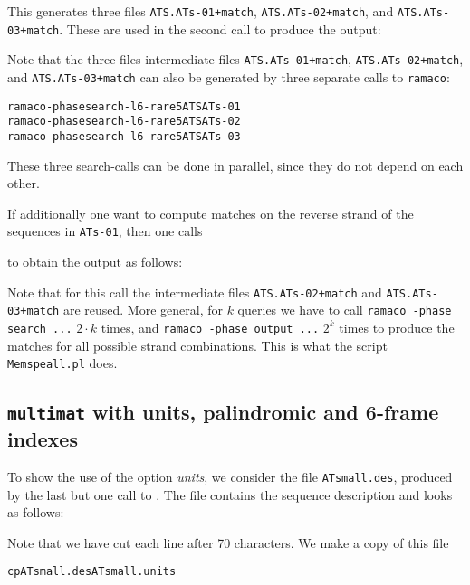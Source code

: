 \documentclass[12pt]{article}
\makeatletter
\newcommand{\MM}{\texttt{multimat}\xspace}
\newcommand{\SEMM}{\texttt{ramaco}\xspace}
\newcommand{\MEMSPEall}{\texttt{Memspeall.pl}\xspace}
\newcommand{\Filename}[1]{\texttt{\small #1}\index{#1@\texttt{#1}}}
\newcommand{\EXECUTE}[1]{}
\newenvironment{Output}{%
\begin{scriptsize}
\begin{alltt}}{%
\end{alltt}
\end{scriptsize}%
\addvspace{-\medskipamount}
}
\newenvironment{LargeOutput}{%
 \begin{footnotesize}
 \begin{alltt}}{%
 \end{alltt}
 \end{footnotesize}%
 \addvspace{-\medskipamount}
}
\makeatother
\begin{document}
This generates three files \texttt{\small ATS.ATs-01+match}, 
\texttt{\small ATS.ATs-02+match}, and \texttt{\small ATS.ATs-03+match}. 
These are used in the second call to produce the output:

\EXECUTE{ramaco -v -phase output -l 6 -rare 5 ATS ATs-01 ATs-02 ATs-03}

Note that the three files intermediate files \texttt{\small ATS.ATs-01+match}, 
\texttt{\small ATS.ATs-02+match}, and \texttt{\small ATS.ATs-03+match} can also 
be generated by three separate calls to \SEMM: 

\begin{Output}
ramaco -phase search -l 6 -rare 5 ATS ATs-01
ramaco -phase search -l 6 -rare 5 ATS ATs-02
ramaco -phase search -l 6 -rare 5 ATS ATs-03
\end{Output}

These three search-calls can be done in parallel, since they do not
depend on each other.

If additionally one want to compute matches on the reverse strand of the
sequences in \texttt{\small ATs-01}, then one calls

\EXECUTE{ramaco -v -phase search -l 6 -rare 5 ATS -ATs-01}

to obtain the output as follows:

\EXECUTE{ramaco -phase output -l 6 -rare 5 ATS -ATs-01 ATs-02 ATs-03}

Note that for this call the intermediate files 
\texttt{\small ATS.ATs-02+match} and \texttt{\small ATS.ATs-03+match} 
are reused. More general, for $k$ queries we have to call
\texttt{ramaco -phase search ...} \(2\cdot k\) times, and
\texttt{ramaco -phase output ...} \(2^{k}\) times to produce the matches
for all possible strand combinations. This is what the script
\MEMSPEall does.

\subsection{\MM with units, palindromic and 6-frame indexes}

To show the use of the option \textit{units}, we consider the
file \Filename{ATsmall.des}, produced by the last but one call to
\MKV. The file contains the sequence description and looks as follows:

\EXECUTE{cat ATsmall.des}

Note that we have cut each line after 70 characters. We make a copy of
this file

\begin{LargeOutput}
cp ATsmall.des ATsmall.units
\end{LargeOutput}
\end{document}
